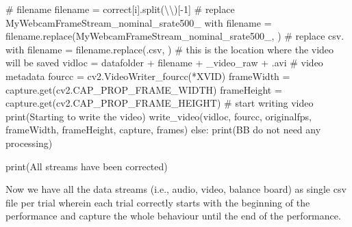 \documentclass[
  letterpaper,
  DIV=11,
  numbers=noendperiod]{scrreprt}
\newenvironment{Shaded}{\begin{snugshade}}{\end{snugshade}}
\newcommand{\BuiltInTok}[1]{\textcolor[rgb]{0.00,0.23,0.31}{#1}}
\newcommand{\CharTok}[1]{\textcolor[rgb]{0.13,0.47,0.30}{#1}}
\newcommand{\CommentTok}[1]{\textcolor[rgb]{0.37,0.37,0.37}{#1}}
\newcommand{\ControlFlowTok}[1]{\textcolor[rgb]{0.00,0.23,0.31}{#1}}
\newcommand{\DecValTok}[1]{\textcolor[rgb]{0.68,0.00,0.00}{#1}}
\newcommand{\NormalTok}[1]{\textcolor[rgb]{0.00,0.23,0.31}{#1}}
\newcommand{\OperatorTok}[1]{\textcolor[rgb]{0.37,0.37,0.37}{#1}}
\newcommand{\StringTok}[1]{\textcolor[rgb]{0.13,0.47,0.30}{#1}}
\begin{document}
\begin{Shaded}
\begin{Highlighting}[]
            \CommentTok{\# filename}
\NormalTok{            filename }\OperatorTok{=}\NormalTok{ correct[i].split(}\StringTok{\textquotesingle{}}\CharTok{\textbackslash{}\textbackslash{}}\StringTok{\textquotesingle{}}\NormalTok{)[}\OperatorTok{{-}}\DecValTok{1}\NormalTok{]}
            \CommentTok{\# replace MyWebcamFrameStream\_nominal\_srate500\_ with \textquotesingle{}\textquotesingle{}}
\NormalTok{            filename }\OperatorTok{=}\NormalTok{ filename.replace(}\StringTok{\textquotesingle{}MyWebcamFrameStream\_nominal\_srate500\_\textquotesingle{}}\NormalTok{, }\StringTok{\textquotesingle{}\textquotesingle{}}\NormalTok{)}
            \CommentTok{\# replace csv. with \textquotesingle{}\textquotesingle{}}
\NormalTok{            filename }\OperatorTok{=}\NormalTok{ filename.replace(}\StringTok{\textquotesingle{}.csv\textquotesingle{}}\NormalTok{, }\StringTok{\textquotesingle{}\textquotesingle{}}\NormalTok{)}
            \CommentTok{\# this is the location where the video will be saved}
\NormalTok{            vidloc }\OperatorTok{=}\NormalTok{ datafolder }\OperatorTok{+}\NormalTok{ filename }\OperatorTok{+} \StringTok{\textquotesingle{}\_video\_raw\textquotesingle{}} \OperatorTok{+} \StringTok{\textquotesingle{}.avi\textquotesingle{}}
            \CommentTok{\# video metadata}
\NormalTok{            fourcc }\OperatorTok{=}\NormalTok{ cv2.VideoWriter\_fourcc(}\OperatorTok{*}\StringTok{\textquotesingle{}XVID\textquotesingle{}}\NormalTok{)}
\NormalTok{            frameWidth }\OperatorTok{=}\NormalTok{ capture.get(cv2.CAP\_PROP\_FRAME\_WIDTH)}
\NormalTok{            frameHeight }\OperatorTok{=}\NormalTok{ capture.get(cv2.CAP\_PROP\_FRAME\_HEIGHT)}
            \CommentTok{\# start writing video}
            \BuiltInTok{print}\NormalTok{(}\StringTok{\textquotesingle{}Starting to write the video\textquotesingle{}}\NormalTok{)}
\NormalTok{            write\_video(vidloc, fourcc, originalfps, frameWidth, frameHeight, capture, frames)}
        \ControlFlowTok{else}\NormalTok{:}
            \BuiltInTok{print}\NormalTok{(}\StringTok{\textquotesingle{}BB do not need any processing\textquotesingle{}}\NormalTok{)}

    \BuiltInTok{print}\NormalTok{(}\StringTok{\textquotesingle{}All streams have been corrected\textquotesingle{}}\NormalTok{)}
\end{Highlighting}
\end{Shaded}

Now we have all the data streams (i.e., audio, video, balance board) as
single csv file per trial wherein each trial correctly starts with the
beginning of the performance and capture the whole behaviour until the
end of the performance.
\end{document}
